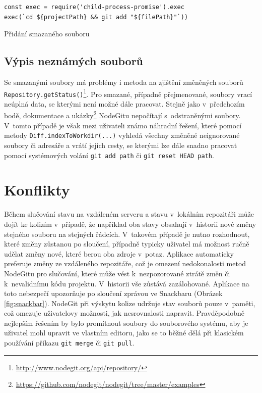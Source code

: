 \FloatBarrier
\begin{listing}[ht]
	\begin{verbatim}
const exec = require('child-process-promise').exec
exec(`cd ${projectPath} && git add "${filePath}"`))
	\end{verbatim}
	\caption{Přidání smazaného souboru}
\end{listing}
\FloatBarrier

\subsection{Výpis neznámých souborů}

Se smazanými soubory má problémy i metoda na zjištění změněných souborů \texttt{Repository.getStatus()}\footnote{\url{http://www.nodegit.org/api/repository/}}. Pro smazané, případně přejmenované, soubory vrací neúplná data, se kterými není možné dále pracovat. Stejně jako v~předchozím bodě, dokumentace a ukázky\footnote{\url{https://github.com/nodegit/nodegit/tree/master/examples}} NodeGitu nepočítají s~odstraněnými soubory. V~tomto případě je však mezi uživateli známo náhradní řešení, které pomocí metody \texttt{Diff.indexToWorkdir(...)} vyhledá všechny změněné neignorované soubory či adresáře a vrátí jejich cesty, se kterými lze dále snadno pracovat pomocí systémových volání \texttt{git add path} či \texttt{git reset HEAD path}.

\section{Konflikty}

Během slučování stavu na vzdáleném serveru a stavu v~lokálním repozitáři může dojít ke kolizím v~případě, že například oba stavy obsahují v~historii nové změny stejného souboru na stejných řádcích. V~takovém případě je nutno rozhodnout, které změny zůstanou po sloučení, případně typicky uživatel má možnost ručně udělat změny nové, které berou oba zdroje v~potaz. Aplikace automaticky preferuje změny ze vzdáleného repozitáře, což je omezení nedokonalosti metod NodeGitu pro slučování, které může vést k~nezpozorované ztrátě změn či k~nevalidnímu kódu projektu. V~historii vše zůstává zazálohované. Aplikace na toto nebezpečí upozorňuje po sloučení zprávou ve Snackbaru (Obrázek \ref{fig:snackbar}). NodeGit při výskytu kolize udržuje stav souborů pouze v~paměti, což omezuje uživatelovy možnosti, jak nesrovnalosti napravit. Pravděpodobně nejlepším řešením by bylo promítnout soubory do souborového systému, aby je uživatel mohl upravit ve vlastním editoru, jako se to běžné dělá při klasickém používání příkazu \texttt{git merge} či \texttt{git pull}.

